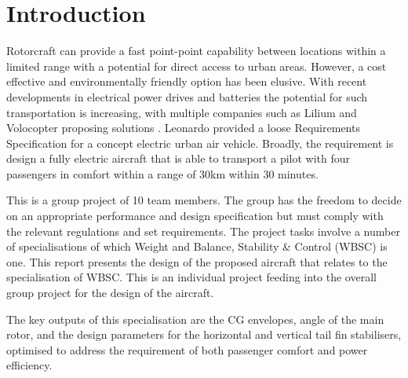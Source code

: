 \documentclass[11pt,a4paper]{article}
\begin{document}
\section{Introduction}
Rotorcraft can provide a fast point-point capability between locations within a limited range with a potential for direct access to urban areas. However, a cost effective and environmentally friendly option has been elusive. With recent developments in electrical power drives and batteries the potential for such transportation is increasing, with multiple companies such as Lilium and Volocopter proposing solutions \cite{bbc}. Leonardo provided a loose Requirements Specification for a concept electric urban air vehicle. Broadly, the requirement is design a fully electric aircraft that is able to transport a pilot with four passengers in comfort within a range of 30km within 30 minutes. 

This is a group project of 10 team members. The group has the freedom to decide on an appropriate performance and design specification but must comply with the relevant regulations and set requirements. The project tasks involve a number of specialisations of which Weight and Balance, Stability \& Control (WBSC) is one. This report presents the design of the proposed aircraft that relates to the specialisation of WBSC. This is an individual project feeding into the overall group project for the design of the aircraft.

The key outputs of this specialisation are the CG envelopes, angle of the main rotor, and the design parameters for the horizontal and vertical tail fin stabilisers, optimised to address the requirement of both passenger comfort and power efficiency.
\end{document}
